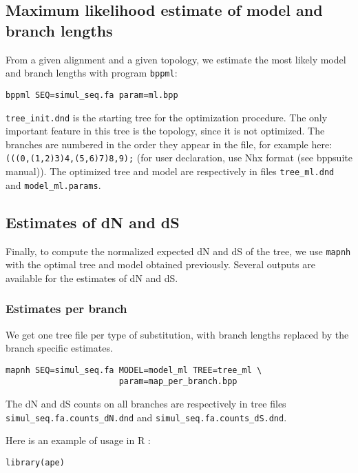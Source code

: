 \documentclass[11pt, a4paper]{article}
\begin{document}
{\subsection*{Maximum likelihood estimate of model and branch lengths}

From a given alignment and a given topology, we estimate the most
likely model and branch lengths with program \texttt{bppml}:

\begin{verbatim}
bppml SEQ=simul_seq.fa param=ml.bpp
\end{verbatim}

\texttt{tree\_init.dnd} is the starting tree for the optimization
procedure. The only important feature in this tree is the topology,
since it is not optimized. The branches are numbered in the order they
appear in the file, for example here:
\texttt{(((0,(1,2)3)4,(5,6)7)8,9);} (for user declaration, use Nhx
format (see bppsuite manual)). The optimized tree and model are
respectively in files \texttt{tree\_ml.dnd} and
\texttt{model\_ml.params}.

\subsection*{Estimates of dN and dS}

Finally, to compute the normalized expected dN and dS of the tree, we
use \texttt{mapnh} with the optimal tree and model obtained
previously. Several outputs are available for the estimates of dN and
dS.

\subsubsection*{Estimates per branch}

We get one tree file per type of substitution, with branch lengths
replaced by the branch specific estimates.

\begin{verbatim}
mapnh SEQ=simul_seq.fa MODEL=model_ml TREE=tree_ml \
                       param=map_per_branch.bpp
\end{verbatim}

The dN and dS counts on all branches are respectively in tree files
\\ 
\verb|simul_seq.fa.counts_dN.dnd| and
\verb|simul_seq.fa.counts_dS.dnd|.

\smallskip

Here is an example of usage in R :

\begin{verbatim}
library(ape)


\end{verbatim}}
\end{document}
